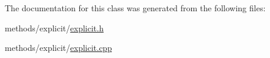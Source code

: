 The documentation for this class was generated from the following files\+:\begin{DoxyCompactItemize}
\item 
methods/explicit/\hyperlink{explicit_8h}{explicit.\+h}\item 
methods/explicit/\hyperlink{explicit_8cpp}{explicit.\+cpp}\end{DoxyCompactItemize}
